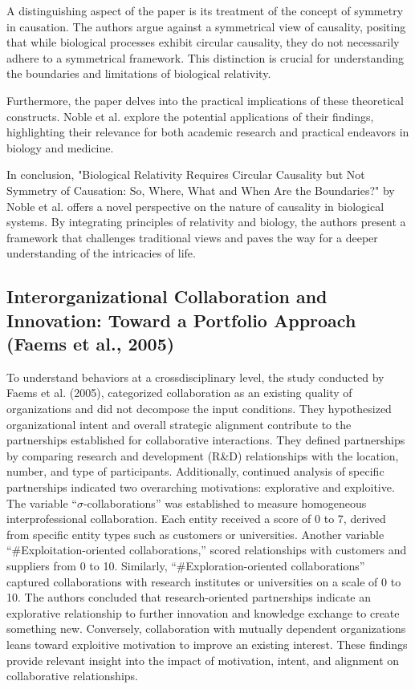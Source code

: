 \documentclass[sn-nature]{sn-jnl}%
\theoremstyle{thmstyleone}%
\theoremstyle{thmstyletwo}%
\theoremstyle{thmstylethree}%
\begin{document}
A distinguishing aspect of the paper is its treatment of the concept of symmetry in causation. The authors argue against a symmetrical view of causality, positing that while biological processes exhibit circular causality, they do not necessarily adhere to a symmetrical framework. This distinction is crucial for understanding the boundaries and limitations of biological relativity.

Furthermore, the paper delves into the practical implications of these theoretical constructs. Noble et al. explore the potential applications of their findings, highlighting their relevance for both academic research and practical endeavors in biology and medicine.

In conclusion, "Biological Relativity Requires Circular Causality but Not Symmetry of Causation: So, Where, What and When Are the Boundaries?" by Noble et al. offers a novel perspective on the nature of causality in biological systems. By integrating principles of relativity and biology, the authors present a framework that challenges traditional views and paves the way for a deeper understanding of the intricacies of life.
\subsection{Interorganizational Collaboration and Innovation: Toward a Portfolio Approach (Faems et al., 2005)\cite{faems_interorganizational_2005}}
To understand behaviors at a crossdisciplinary level, the study conducted by Faems et al. (2005), categorized collaboration as an existing quality of organizations and did not decompose the input conditions. They hypothesized organizational intent and overall strategic alignment contribute to the partnerships established for collaborative interactions\cite{faems_interorganizational_2005}. They defined partnerships by comparing research and development (R\&D) relationships with the location, number, and type of participants. Additionally, continued analysis of specific partnerships indicated two overarching motivations: explorative and exploitive. The variable \enquote{$\sigma$-collaborations} was established to measure homogeneous interprofessional collaboration. Each entity received a score of 0 to 7, derived from specific entity types such as customers or universities.  Another variable \enquote{\#Exploitation-oriented collaborations,} scored relationships with customers and suppliers from 0 to 10. Similarly, \enquote{\#Exploration-oriented collaborations} captured collaborations with research institutes or universities on a scale of 0 to 10\cite{faems_interorganizational_2005}. The authors concluded that research-oriented partnerships indicate an explorative relationship to further innovation and knowledge exchange to create something new. Conversely, collaboration with mutually dependent organizations leans toward exploitive motivation to improve an existing interest\cite{faems_interorganizational_2005}. These findings provide relevant insight into the impact of motivation, intent, and alignment on collaborative relationships.
\end{document}
